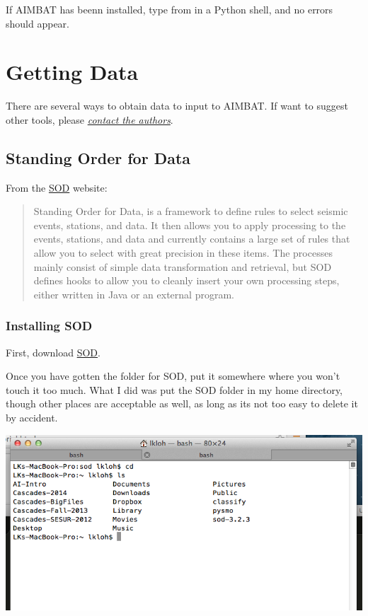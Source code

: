 \documentclass[letterpaper,10pt,english]{sphinxmanual}
\begin{document}
If AIMBAT has beenn installed, type from  in a Python shell, and no errors should appear.


\chapter{Getting Data}
\label{docfiles/gettingData:getting-data}\label{docfiles/gettingData::doc}
There are several ways to obtain data to input to AIMBAT. If want to suggest other tools, please {\hyperref[docfiles/introduction:authors-contacts]{\emph{contact the authors}}}.


\section{Standing Order for Data}
\label{docfiles/gettingData:standing-order-for-data}
From the \href{http://www.seis.sc.edu/index.html}{SOD} website:
\begin{quote}

Standing Order for Data, is a framework to define rules to select seismic events, stations, and data. It then allows you to apply processing to the events, stations, and data and currently contains a large set of rules that allow you to select with great precision in these items. The processes mainly consist of simple data transformation and retrieval, but SOD defines hooks to allow you to cleanly insert your own processing steps, either written in Java or an external program.
\end{quote}


\subsection{Installing SOD}
\label{docfiles/gettingData:installing-sod}
First, download \href{http://www.seis.sc.edu/index.html}{SOD}.

Once you have gotten the folder for SOD, put it somewhere where you won't touch it too much. What I did was put the SOD folder in my home directory, though other places are acceptable as well, as long as its not too easy to delete it by accident.

\includegraphics{sod_location.png}
\end{document}
